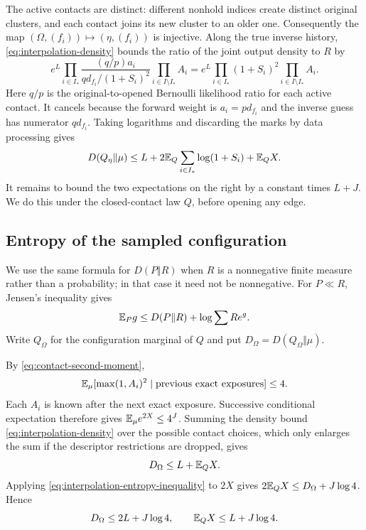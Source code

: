 The active contacts are distinct: different nonhold indices create
distinct original clusters, and each contact joins its new cluster to
an older one. Consequently the map
$(\Omega,(f_i))\mapsto(\eta,(f_i))$ is injective. Along the true inverse
history, \eqref{eq:interpolation-density} bounds the ratio of the joint
output density to $R$ by
\[
 e^L\prod_{i\in I_*}
 \frac{(q/p)a_i}{qd_{f_i}/(1+S_i)^2}
 \prod_{i\in I\setminus I_*}A_i
 =e^L\prod_{i\in I_*}(1+S_i)^2
       \prod_{i\in I\setminus I_*}A_i.
\]
Here $q/p$ is the original-to-opened Bernoulli likelihood ratio for each
active contact. It cancels because the forward weight is $a_i=pd_{f_i}$
and the inverse guess has numerator $qd_{f_i}$.
Taking logarithms and discarding the marks by data processing gives
\begin{equation}\label{eq:interpolation-cost-to-bound}
 D(Q_\eta\Vert\mu)
 \le L+2\mathbb E_Q\sum_{i\in I_*}\log(1+S_i)+\mathbb E_Q X.
\end{equation}
It remains to bound the two expectations on the right by a constant
times $L+J$. We do this under the closed-contact law $Q$, before opening
any edge.

\subsection{Entropy of the sampled configuration}

We use the same formula for $D(P\Vert R)$ when $R$ is a nonnegative finite
measure rather than a probability; in that case it need not be
nonnegative. For $P\ll R$, Jensen's inequality gives
\begin{equation}\label{eq:interpolation-entropy-inequality}
 \mathbb E_P g\le D(P\Vert R)+\log\sum R e^g.
\end{equation}
Write $Q_\Omega$ for the configuration marginal of $Q$ and put
$D_\Omega=D(Q_\Omega\Vert\mu)$.

By \eqref{eq:contact-second-moment},
\[
 \mathbb E_\mu[\max(1,A_i)^2\mid\text{previous exact exposures}]\le4.
\]
Each $A_i$ is known after the next exact exposure. Successive conditional
expectation therefore gives
$\mathbb E_\mu e^{2X}\le4^J$. Summing the density bound
\eqref{eq:interpolation-density} over the possible contact choices,
which only enlarges the sum if the descriptor restrictions are dropped,
gives
\[
 D_\Omega\le L+\mathbb E_Q X.
\]
Applying \eqref{eq:interpolation-entropy-inequality} to $2X$ gives
$2\mathbb E_Q X\le D_\Omega+J\log4$. Hence
\begin{equation}\label{eq:interpolation-configuration-entropy}
 D_\Omega\le2L+J\log4,
 \qquad \mathbb E_Q X\le L+J\log4.
\end{equation}

